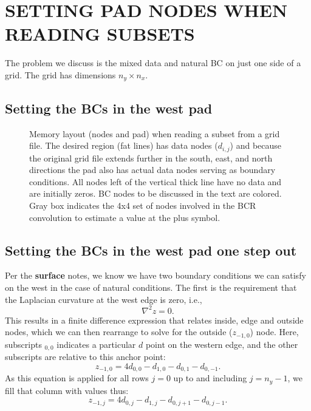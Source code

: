 \documentclass[12pt,letterpaper,margin=0.5in]{article}
\newcommand{\PDFfig}[4][tbp]{\begin{figure}[#1] \centering \epsfig{figure=#2,width=#4} \caption{{\small #3}} \label{fig:#2} \end{figure}}
\begin{document}
\section{SETTING PAD NODES WHEN READING SUBSETS}

The problem we discuss is the mixed data and natural BC on just one side of a grid.  The grid
has dimensions $n_y \times n_x$.

\subsection{Setting the BCs in the west pad}
\label{sec:west}
\PDFfig[h]{nodes}{Memory layout (nodes and pad) when reading a subset from a grid file.  The desired region (fat lines)
has data nodes ($d_{i,j}$) and because the original grid file extends further in the south, east, and north
directions the pad also has actual data nodes serving as boundary conditions. All nodes left of the vertical thick
line have no data and are initially zeros.  BC nodes to be discussed in the text are colored. Gray box indicates the 
4x4 set of nodes involved in the BCR convolution to estimate a value at the plus symbol.}{4.5in}

\subsection{Setting the BCs in the west pad one step out}
Per the {\bf surface} notes, we know we have two boundary conditions we can satisfy on the west in the case of
natural conditions. The first is the requirement that the Laplacian curvature at the west edge is zero, i.e.,
\begin{equation}
	\nabla^2 z = 0.
\end{equation}
This results in a finite difference expression that relates inside, edge and outside nodes, which we can then
rearrange to solve for the outside ($z_{-1,0}$) node.  Here, subscripts $_{0,0}$ indicates a particular $d$ point on the
western edge, and the other subscripts are relative to this anchor point:
\begin{equation}
	z_{-1,0} = 4 d_{0,0} - d_{1,0} - d_{0,1} - d_{0,-1}.
	\label{eq:BC1}
\end{equation}
As this equation is applied for all rows $j = 0$ up to and including $j = n_y - 1$, we fill that column with values thus:
\begin{equation}
	z_{-1,j} = 4 d_{0,j} - d_{1,j} - d_{0,j+1} - d_{0,j-1}.
	\label{eq:BC1j}
\end{equation}
\end{document}
